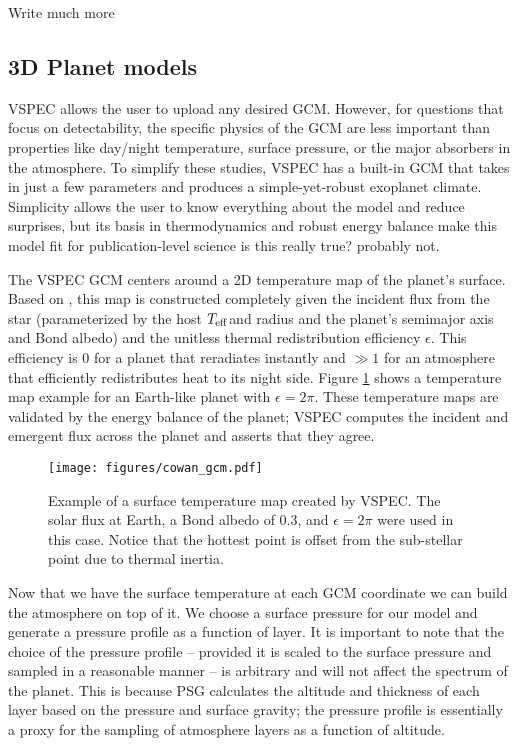 \documentclass[twocolumn]{aastex631}
\newcommand{\teff}{$T_{\rm eff}$}
\newcommand{\TJ}[1]{\textcolor{tedcommentcolor}{#1}}
\begin{document}
\TJ{Write much more}

\subsection{3D Planet models}
{\sc VSPEC} allows the user to upload any desired GCM. However, for questions that focus on detectability,
the specific physics of the GCM are less important than properties like day/night temperature, surface pressure, or
the major absorbers in the atmosphere. To simplify these studies, {\sc VSPEC} has a built-in GCM that takes in just a
few parameters and produces a simple-yet-robust exoplanet climate. Simplicity allows the user to know everything about
the model and reduce surprises, but its basis in thermodynamics and robust energy balance make this model fit for publication-level science \TJ{is this really true? probably not}.

The {\sc VSPEC} GCM centers around a 2D temperature map of the planet's surface. Based on \citet{cowan2011}, this map
is constructed completely given the incident flux from the star (parameterized by the host \teff and radius
and the planet's semimajor axis and Bond albedo) and the unitless thermal redistribution efficiency $\epsilon$.
This efficiency is 0 for a planet that reradiates instantly and $\gg 1$ for an atmosphere that efficiently redistributes heat to its night side.
Figure \ref{fig:thermal_inertia} shows a temperature map example for an Earth-like planet with $\epsilon = 2\pi$.
These temperature maps are validated by the energy balance of the planet; {\sc VSPEC} computes the incident and emergent
flux across the planet and asserts that they agree.

\begin{figure}
    \centering
    \texttt{[image: figures/cowan\_gcm.pdf]}
    \caption{
        Example of a surface temperature map created by {\sc VSPEC}. The solar flux at Earth,
        a Bond albedo of 0.3, and $\epsilon = 2\pi$ were used in this case.
        Notice that the hottest point is offset from the sub-stellar point due to thermal inertia.
    }
    \label{fig:thermal_inertia}
\end{figure}

Now that we have the surface temperature at each GCM coordinate we can build the atmosphere on top of it.
We choose a surface pressure for our model and generate a pressure profile as a function of layer. It is
important to note that the choice of the pressure profile -- provided it is scaled to the surface pressure and sampled in a reasonable manner -- is
arbitrary and will not affect the spectrum of the planet. This is because PSG calculates the altitude and thickness of each layer based on the
pressure and surface gravity; the pressure profile is essentially a proxy for the sampling of atmosphere layers as a function of altitude.
\end{document}
